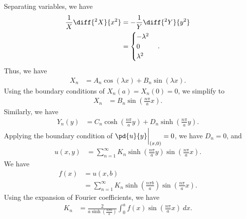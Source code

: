 \documentclass[10pt]{mypackage}
\begin{document}
\begin{solution}[12.5, Problem 2]
  Separating variables, we have
  \begin{align*}
    \frac{1}{X}\diff{^2X}{x^2} &= -\frac{1}{Y}\diff{^2Y}{y^2}\\
                               &= \begin{cases}
                                 -\lambda^2\\
                                 0\\
                                 \lambda^2
                               \end{cases}.
  \end{align*}
  Thus, we have
  \begin{align*}
    X_n &= A_n\cos\left( \lambda x \right) + B_n\sin\left( \lambda x \right).
  \end{align*}
  Using the boundary conditions of $X_n(a) = X_n(0) = 0$, we simplify to
  \begin{align*}
    X_n &= B_n\sin\left( \frac{n\pi}{a}x \right).
  \end{align*}
  Similarly, we have
  \begin{align*}
    Y_n(y) &= C_n\cosh\left( \frac{n\pi}{a}y \right) + D_n\sinh\left( \frac{n\pi}{a}y \right).
  \end{align*}
  Applying the boundary condition of $\pd{u}{y}\biggr\vert_{(x,0)} = 0$, we have $D_n = 0$, and
  \begin{align*}
    u(x,y) &= \sum_{n=1}^{\infty}K_n\sinh\left( \frac{n\pi}{a}y \right) \sin\left( \frac{n\pi}{a}x \right).
  \end{align*}
  We have
  \begin{align*}
    f(x) &= u\left( x,b \right)\\
         &= \sum_{n=1}^{\infty}K_n\sinh\left( \frac{n\pi b}{a} \right)\sin\left( \frac{n\pi}{a}x \right).
  \end{align*}
  Using the expansion of Fourier coefficients, we have
  \begin{align*}
    K_n &= \frac{2}{a\sinh\left( \frac{n\pi b}{a} \right)} \int_{0}^{a} f(x)\sin\left( \frac{n\pi}{a}x \right)\:dx.
  \end{align*}
\end{solution}
\begin{solution}[12.5, Problem 4]

\end{solution}
\begin{solution}[12.5, Problem 6]

\end{solution}
\begin{solution}[12.5, Problem 8]

\end{solution}
\begin{solution}[12.6, Problem 2]

\end{solution}
\begin{solution}[12.6, Problem 4]

\end{solution}
\begin{solution}[12.6, Problem 10]

\end{solution}
\begin{solution}

\end{solution}
\end{document}
